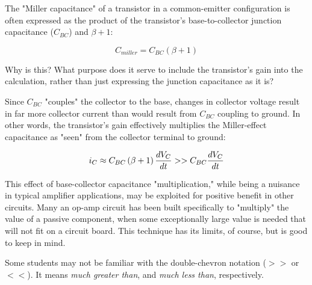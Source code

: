 

The "Miller capacitance" of a transistor in a common-emitter configuration is often expressed as the product of the transistor's base-to-collector junction capacitance ($C_{BC}$) and $\beta +1$:

$$C_{miller} = C_{BC}\left( \beta + 1 \right)$$

Why is this?  What purpose does it serve to include the transistor's gain into the calculation, rather than just expressing the junction capacitance as it is? 







Since $C_{BC}$ "couples" the collector to the base, changes in collector voltage result in far more collector current than would result from $C_{BC}$ coupling to ground.  In other words, the transistor's gain effectively multiplies the Miller-effect capacitance as "seen" from the collector terminal to ground:

$$i_C \approx C_{BC}\left( \beta + 1 \right){dV_C \over dt} >> C_{BC}{dV_C \over dt}$$







This effect of base-collector capacitance "multiplication," while being a nuisance in typical amplifier applications, may be exploited for positive benefit in other circuits.  Many an op-amp circuit has been built specifically to "multiply" the value of a passive component, when some exceptionally large value is needed that will not fit on a circuit board.  This technique has its limits, of course, but is good to keep in mind.

Some students may not be familiar with the double-chevron notation ($>>$ or $<<$).  It means {\it much greater than}, and {\it much less than}, respectively.




